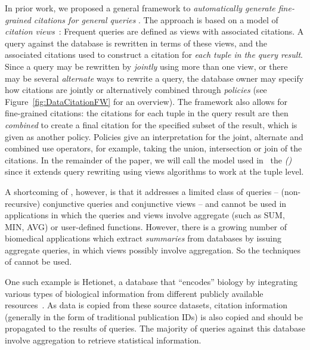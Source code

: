 In prior work, we proposed a general framework to {\em automatically generate fine-grained citations for general queries} \cite{alawini2017automating,wu2018data}.
The approach is based on a model of {\em citation views}~\cite{BunemanEtAl2016,davidson2017model,DBLP:conf/pods/DavidsonBDMS17}: Frequent queries  are defined as views with associated citations. A query against the database is rewritten in terms of these views, and the associated citations used to construct a citation for \textit{each tuple in the query result}. Since a query may be rewritten by \textit{jointly} using more than one view, or there may be several \textit{alternate} ways to rewrite a query, the database owner may specify how citations are jointly or alternatively combined through \textit{policies} (see Figure~\ref{fig:DataCitationFW} for an overview).  The framework also allows for fine-grained citations: the citations for each tuple in the query result are then \textit{combined} to create a final citation for the specified subset of the result, which is given as another policy.  Policies give an interpretation for the joint, alternate and combined use operators, for example, taking the union, intersection or join of the citations.  In the remainder of the paper, we will call the model used in~\cite{wu2018data} the {\em {\rbafull} (\rba)} since it  extends query rewriting using views algorithms to work at the tuple level.

A shortcoming of {\rba}, however, is that it addresses a limited class of queries -- (non-recursive) conjunctive queries and conjunctive views -- and cannot be used in applications in which the queries and views involve aggregate (such as SUM, MIN, AVG) or user-defined functions.  However, there is a growing number of biomedical applications which extract \textit{summaries} from data\-bases by issuing aggregate queries, in which views possibly involve aggregation. So the techniques of \cite{wu2018data} cannot be used.


One such example is Hetionet, a database that ``encodes'' biology by integrating various types of biological information from different publicly available resources~\cite{himmelstein2017systematic}.
As data is copied from these source datasets, citation information (generally in the form of traditional publication IDs) is also copied and should be propagated to the results of queries.
The majority of queries against this database involve aggregation to retrieve statistical information.


